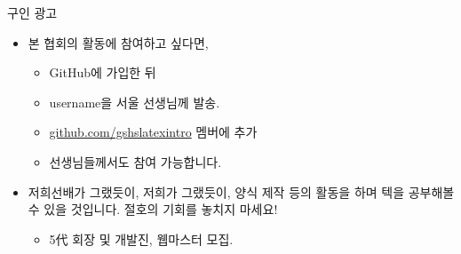 \documentclass[12pt]{gshs_lecture}
\begin{document}
\begin{frame}[t]{구인 광고}
	\begin{itemize}
		\item 본 협회의 활동에 참여하고 싶다면,
		\begin{itemize}
			\item GitHub에 가입한 뒤
			\item username을 서울 선생님께 발송.
			\item \url{github.com/gshslatexintro} 멤버에 추가
			\item 선생님들께서도 참여 가능합니다.
		\end{itemize}
		\vskip 1pc
		\item 저희선배가 그랬듯이, 저희가 그랬듯이, 양식 제작 등의 활동을 하며 텍을 공부해볼 수 있을 것입니다. 절호의 기회를 놓치지 마세요!
		\begin{itemize}
			\item 5代 회장 및 개발진, 웹마스터 모집.
		\end{itemize}
	\end{itemize}
	
\end{frame}
\end{document}
